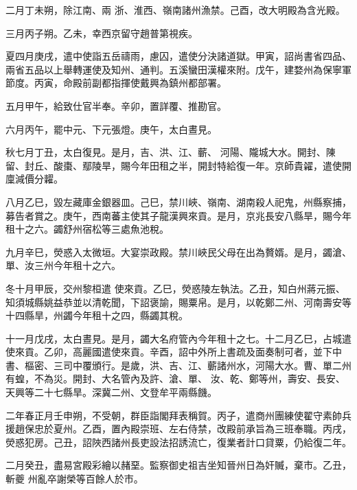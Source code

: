\begin{pinyinscope}
 二月丁未朔，除江南、兩
 浙、淮西、嶺南諸州漁禁。己酉，改大明殿為含光殿。



 三月丙子朔。乙未，幸西京留守趙普第視疾。



 夏四月庚戌，遣中使詣五岳禱雨，慮囚，遣使分決諸道獄。甲寅，詔尚書省四品、兩省五品以上舉轉運使及知州、通判。五溪蠻田漢權來附。戊午，建婺州為保寧軍節度。丙寅，命殿前副都指揮使戴興為鎮州都部署。



 五月甲午，給致仕官半奉。辛卯，置詳覆、推勘官。



 六月丙午，罷中元、下元張燈。庚午，太白晝見。



 秋七月丁丑，太白復見。是月，吉、洪、江、蘄、
 河陽、隴城大水。開封、陳留、封丘、酸棗、鄢陵旱，賜今年田租之半，開封特給復一年。京師貴糴，遣使開廩減價分糶。



 八月乙巳，毀左藏庫金銀器皿。己巳，禁川峽、嶺南、湖南殺人祀鬼，州縣察捕，募告者賞之。庚午，西南蕃主使其子龍漢興來貢。是月，京兆長安八縣旱，賜今年租十之六。蠲舒州宿松等三處魚池稅。



 九月辛巳，熒惑入太微垣。大宴崇政殿。禁川峽民父母在出為贅婿。是月，蠲滄、單、汝三州今年租十之六。



 冬十月甲辰，交州黎桓遣
 使來貢。乙巳，熒惑陵左執法。乙丑，知白州蔣元振、知須城縣姚益恭並以清乾聞，下詔褒諭，賜粟帛。是月，以乾鄭二州、河南壽安等十四縣旱，州蠲今年租十之四，縣蠲其稅。



 十一月戊戌，太白晝見。是月，蠲大名府管內今年租十之七。十二月乙巳，占城遣使來貢。乙卯，高麗國遣使來貢。辛酉，詔中外所上書疏及面奏制可者，並下中書、樞密、三司中覆頒行。是歲，洪、吉、江、蘄諸州水，河陽大水。曹、單二州有蝗，不為災。開封、大名管內及許、滄、單、
 汝、乾、鄭等州，壽安、長安、天興等二十七縣旱。深冀二州、文登牟平兩縣饑。



 二年春正月壬申朔，不受朝，群臣詣閣拜表稱賀。丙子，遣商州團練使翟守素帥兵援趙保忠於夏州。乙酉，置內殿崇班、左右侍禁，改殿前承旨為三班奉職。丙戌，熒惑犯房。己丑，詔陜西諸州長吏設法招誘流亡，復業者計口貸粟，仍給復二年。



 二月癸丑，盡易宮殿彩繪以赭堊。監察御史祖吉坐知晉州日為奸贓，棄市。乙丑，斬夔
 州亂卒謝榮等百餘人於市。




\end{pinyinscope}
